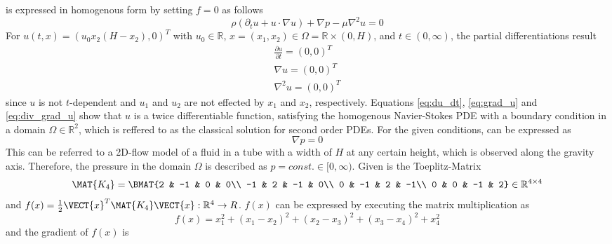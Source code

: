  is expressed in homogenous form by setting $f = 0$ as follows
\begin{equation}
	\rho(\partial_t u + u \cdot \nabla u) + \nabla p - \mu \nabla ^2 u = 0
	\label{eq:NavStokesHom}
\end{equation}
For $u (t,x) = (u_0 x_2 (H - x_2), 0)^T$ with $u_0 \in \mathbb{R}$, $x = (x_ 1, x_2) \in \Omega = \mathbb{R} \times (0, H)$, and $t \in (0, \infty)$, the partial differentiations result
\begin{align}
	\frac{\partial u}{\partial t} = (0,0)^T \label{eq:du_dt}   \\
	\nabla u = (0,0)^T  					\label{eq:grad_u} \\
	\nabla^2 u = (0,0)^T  					\label{eq:div_grad_u}
\end{align}
%
since $u$ is not $t$-dependent and $u_1$ and $u_2$ are not effected by $x_1$ and $x_2$, respectively.
Equations \ref{eq:du_dt}, \ref{eq:grad_u} and \ref{eq:div_grad_u} show that $u$ is a twice differentiable function, satisfying the homogenous Navier-Stokes PDE with a boundary condition in a domain $\Omega \in \mathbb{R}^2$, which is reffered to as the classical solution for second order PDEs.
%
For the given conditions,  can be expressed as
\begin{equation}
	\nabla p = 0
\end{equation}
This can be referred to a 2D-flow model of a fluid in a tube with a width of $H$ at any certain height, which is observed along the gravity axis. Therefore, the pressure in the domain $\Omega$ is described as $p = const. \in [0, \infty)$.
%
Given is the Toeplitz-Matrix
\begin{equation}
	\MAT{K_4} = \BMAT{2 & -1 & 0 & 0\\
				-1 & 2 & -1 & 0\\
				0 & -1 & 2 & -1\\
				0 & 0 & -1 & 2} \in \mathbb{R}^{4 \times 4}
\end{equation}
and $f(x) = \frac{1}{2} \VECT{x}^T \MAT{K_4} \VECT{x}: \mathbb{R}^4 \rightarrow R$.
%
$f(x)$ can be expressed by executing the matrix multiplication as
\begin{equation}
	f(x)= x_1^2 + (x_1 - x_2)^2 + (x_2 - x_3)^2 + (x_3 - x_4)^2 + x_4^2
	\label{eq:fx_detail}
\end{equation}
and the gradient of $f(x)$ is
